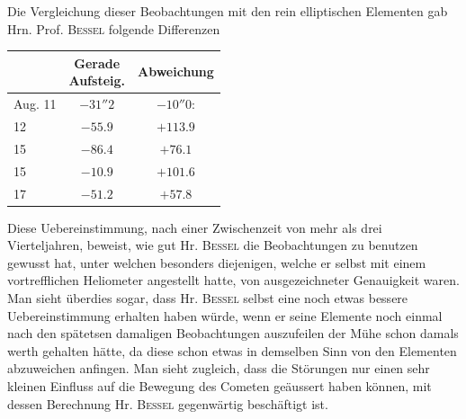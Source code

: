 \par\indent Die Vergleichung dieser Beobachtungen mit den rein elliptischen Elementen gab Hrn. Prof. \textsc{Bessel} folgende Differenzen
\begin{center}\fontsize{10}{12}\selectfont\setlength{\tabcolsep}{8pt}\renewcommand{\arraystretch}{1.15}\begin{tabular}{l|c|c}
& \shortstack{Gerade\\Aufsteig.} & Abweichung\\\hline
Aug. 11 & $-31''2$ & $-10''0$:\\
12 & $-55.9$ & $+113.9$\\
15 & $-86.4$ & $+76.1$\\
15 & $-10.9$ & $+101.6$\\
17 & $-51.2$ & $+57.8$\\
\end{tabular}\end{center}

\par\indent Diese Uebereinstimmung, nach einer Zwischenzeit von mehr als drei Vierteljahren, beweist, wie gut Hr. \textsc{Bessel} die Beobachtungen zu benutzen gewusst hat, unter welchen besonders diejenigen, welche er selbst mit einem vortrefflichen Heliometer angestellt hatte, von ausgezeichneter Genauigkeit waren. Man sieht überdies sogar, dass Hr. \textsc{Bessel} selbst eine noch etwas bessere Uebereinstimmung erhalten haben würde, wenn er seine Elemente noch einmal nach den spätetsen 
damaligen Beobachtungen auszufeilen der Mühe schon damals werth gehalten hätte, da diese schon etwas in demselben Sinn von den Elementen abzuweichen anfingen. Man sieht zugleich, dass die Störungen nur einen sehr kleinen Einfluss auf die Bewegung des Cometen geäussert haben können, mit dessen Berechnung Hr. \textsc{Bessel} gegenwärtig beschäftigt ist.
